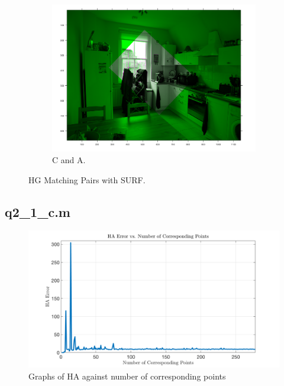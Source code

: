 \documentclass[a4paper, 10pt, conference]{ieeeconf}
\begin{document}
\begin{figure}[!ht]
\begin{subfigure}{0.3\linewidth}
      \includegraphics[width=\textwidth]{pic/q2_1_b5_CA}
      \caption{C and A.}
    \end{subfigure}

	\caption{HG Matching Pairs with SURF.}
\end{figure}


\newpage

\subsection*{q2\_1\_c.m}

\begin{figure}[!ht]
  \centering
  \includegraphics[width=\linewidth]{pic/q2_1_c}
  \caption{Graphs of HA against number of corresponding points}
\end{figure}


\newpage
\end{document}
